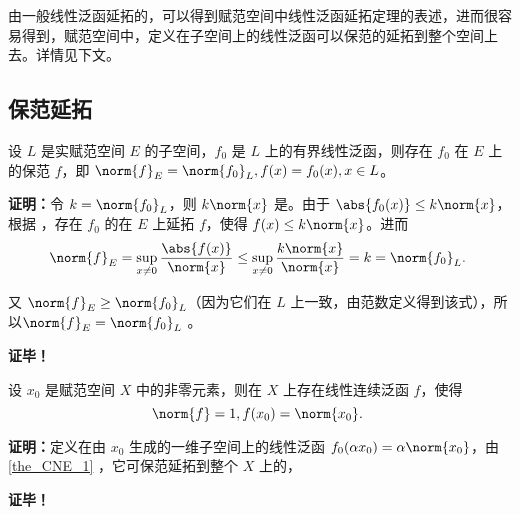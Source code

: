 

由一般线性泛函延拓的，可以得到赋范空间中线性泛函延拓定理的表述，进而很容易得到，赋范空间中，定义在子空间上的线性泛函可以保范的延拓到整个空间上去。详情见下文。

\subsection{保范延拓}

\begin{theorem}{}\label{the_CNE_1}
设 $L$ 是实赋范空间 $E$ 的子空间，$f_0$ 是 $L$ 上的有界线性泛函，则存在 $f_0$ 在 $E$ 上的保范 $f$，即 $\norm{f}_{E}=\norm{f_0}_{L},f(x)=f_0(x),x\in L$。
\end{theorem}

\textbf{证明：}令 $k=\norm{f_0}_{L}$，则 $k\norm{x}$ 是。由于 $\abs{f_0(x)}\leq k\norm{x}$，根据 ，存在 $f_0$ 的在 $E$ 上延拓 $f$，使得 $f(x)\leq k\norm{x}$。进而
\begin{equation}
\norm{f}_E=\sup_{x\neq0}\frac{\abs{f(x)}}{\norm{x}}\leq\sup_{x\neq0}\frac{k\norm{x}}{\norm{x}}=k=\norm{f_0}_L.~
\end{equation}
 
又 $\norm{f}_E\geq \norm{f_0}_L$（因为它们在 $L$ 上一致，由范数定义得到该式），所以$\norm{f}_{E}=\norm{f_0}_{L}$ 。

\textbf{证毕！}


\begin{corollary}{}
设 $x_0$ 是赋范空间 $X$ 中的非零元素，则在 $X$ 上存在线性连续泛函 $f$，使得
\begin{equation}
\norm{f}=1,f(x_0)=\norm{x_0}.~
\end{equation}

\end{corollary}

\textbf{证明：}定义在由  $x_0$ 生成的一维子空间上的线性泛函 $f_0(\alpha x_0)=\alpha\norm{x_0}$，由\autoref{the_CNE_1} ，它可保范延拓到整个 $X$ 上的，


\textbf{证毕！}

